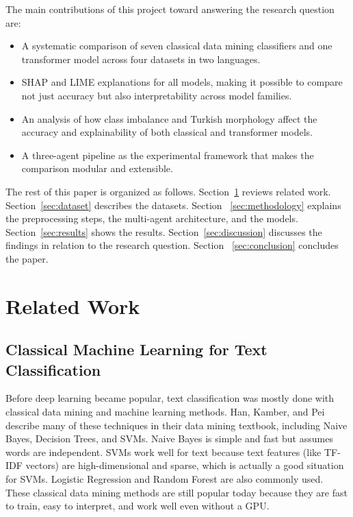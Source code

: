 \documentclass[conference]{IEEEtran}
\begin{document}
The main contributions of this project toward answering the research question are:
\begin{itemize}
	\item A systematic comparison of seven classical data mining classifiers and one
	      transformer model across four datasets in two languages.
	\item SHAP and LIME explanations for all models, making it possible to compare not just
	      accuracy but also interpretability across model families.
	\item An analysis of how class imbalance and Turkish morphology affect the accuracy and
	      explainability of both classical and transformer models.
	\item A three-agent pipeline as the experimental framework that makes the comparison
	      modular and extensible.
\end{itemize}

The rest of this paper is organized as follows. Section~\ref{sec:related_work} reviews
related work. Section~\ref{sec:dataset} describes the datasets. Section~%
\ref{sec:methodology} explains the preprocessing steps, the multi-agent architecture, and
the models. Section~\ref{sec:results} shows the results. Section~\ref{sec:discussion}
discusses the findings in relation to the research question. Section~%
\ref{sec:conclusion} concludes the paper.

\section{Related Work}
\label{sec:related_work}

\subsection{Classical Machine Learning for Text Classification}

Before deep learning became popular, text classification was mostly done with classical
data mining and machine learning methods. Han, Kamber, and Pei~\cite{b1} describe many of
these techniques in their data mining textbook, including Naive Bayes, Decision Trees, and
SVMs. Naive Bayes is simple and fast but assumes words are independent. SVMs work well for
text because text features (like TF-IDF vectors) are high-dimensional and sparse, which is
actually a good situation for SVMs. Logistic Regression and Random Forest are also commonly
used. These classical data mining methods are still popular today because they are fast to
train, easy to interpret, and work well even without a GPU.
\end{document}

